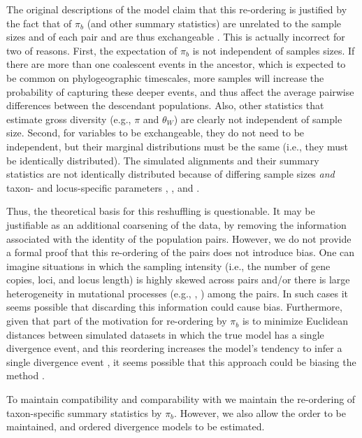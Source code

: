 \documentclass[letterpaper,12pt]{article}
\begin{document}
\begin{linenumbers}
The original descriptions of the \msb model claim that this re-ordering is
justified by the fact that of $\pi_b$ (and other summary statistics) are
unrelated to the sample sizes  and  of
each pair and are thus exchangeable \citep{Hickerson2006,Huang2011}.
This is actually incorrect for two of reasons.
First, the expectation of $\pi_b$ is not independent of samples sizes.
If there are more than one coalescent events in the ancestor, which is expected
to be common on phylogeographic timescales, more samples will increase the
probability of capturing these deeper events, and thus affect the average
pairwise differences between the descendant populations.
Also, other statistics that estimate gross diversity (e.g., $\pi$ and
$\theta_W$) are clearly not independent of sample size.
Second, for variables to be exchangeable, they do not need to be independent,
but their marginal distributions must be the same (i.e., they must be
identically distributed).
The simulated alignments and their summary statistics are not identically
distributed because of differing sample sizes \emph{and} taxon- and
locus-specific parameters \hkyModel{}{}, \mutationRateScalarConstant{}{}, and
\ploidyScalar{}{}.

Thus, the theoretical basis for this reshuffling is questionable.
It may be justifiable as an additional coarsening of the data,
by removing the information associated with the identity of the
population pairs.
However, we do not provide a formal proof that this re-ordering of the pairs
does not introduce bias.
One can imagine situations in which the sampling intensity (i.e., the
number of gene copies, loci, and locus length) is highly skewed across
pairs and/or there is large heterogeneity in mutational processes
(e.g., \hkyModel{}{}, \mutationRateScalarConstant{}{}) among the pairs.
In such cases it seems possible that discarding this information could
cause bias.
Furthermore, given that part of the motivation for re-ordering by $\pi_b$ is to
minimize Euclidean distances between simulated datasets in which the true model
has a single divergence event, and this reordering increases the model's
tendency to infer a single divergence event \citep{Huang2011}, it seems
possible that this approach could be biasing the method \citep{Oaks2012}.

To maintain compatibility and comparability with \msb we maintain
the re-ordering of taxon-specific summary statistics by $\pi_b$.
However, we also allow the order to be maintained, and ordered
divergence models to be estimated.


\end{linenumbers}
\end{document}

